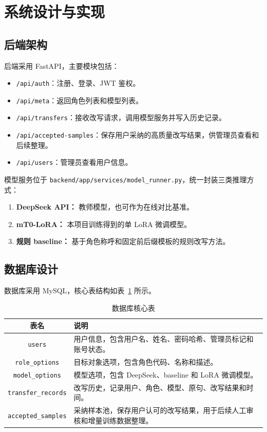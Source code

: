 \documentclass[12pt,a4paper]{ctexart}
\begin{document}
\section{系统设计与实现}

\subsection{后端架构}

后端采用 FastAPI，主要模块包括：

\begin{itemize}[leftmargin=2em]
  \item \texttt{/api/auth}：注册、登录、JWT 鉴权。
  \item \texttt{/api/meta}：返回角色列表和模型列表。
  \item \texttt{/api/transfers}：接收改写请求，调用模型服务并写入历史记录。
  \item \texttt{/api/accepted-samples}：保存用户采纳的高质量改写结果，供管理员查看和后续整理。
  \item \texttt{/api/users}：管理员查看用户信息。
\end{itemize}

模型服务位于 \texttt{backend/app/services/model\_runner.py}，统一封装三类推理方式：

\begin{enumerate}[leftmargin=2em]
  \item \textbf{DeepSeek API：} 教师模型，也可作为在线对比基准。
  \item \textbf{mT0-LoRA：} 本项目训练得到的单 LoRA 微调模型。
  \item \textbf{规则 baseline：} 基于角色称呼和固定前后缀模板的规则改写方法。
\end{enumerate}

\subsection{数据库设计}

数据库采用 MySQL，核心表结构如表~\ref{tab:database} 所示。

\begin{table}[H]
\centering
\caption{数据库核心表}
\label{tab:database}
\begin{tabular}{c|p{8.5cm}}
\toprule
表名 & 说明 \\
\midrule
\texttt{users} & 用户信息，包含用户名、姓名、密码哈希、管理员标记和账号状态。 \\
\texttt{role\_options} & 目标对象选项，包含角色代码、名称和描述。 \\
\texttt{model\_options} & 模型选项，包含 DeepSeek、baseline 和 LoRA 微调模型。 \\
\texttt{transfer\_records} & 改写历史，记录用户、角色、模型、原句、改写结果和时间。 \\
\texttt{accepted\_samples} & 采纳样本池，保存用户认可的改写结果，用于后续人工审核和增量训练数据整理。 \\
\bottomrule
\end{tabular}
\end{table}
\end{document}
